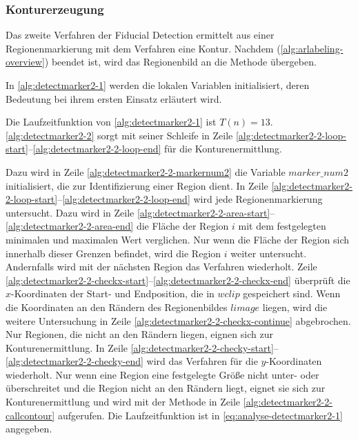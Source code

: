 \subsubsection{Konturerzeugung} %
\label{sec:konturerzeugung}

Das zweite Verfahren der Fiducial Detection ermittelt aus einer Regionenmarkierung mit dem Verfahren
  eine Kontur. Nachdem  (\autoref{alg:arlabeling-overview}) beendet ist,
 wird das Regionenbild an die Methode  übergeben.

In \autoref{alg:detectmarker2-1} werden die lokalen Variablen initialisiert, deren Bedeutung bei ihrem ersten Einsatz
 erläutert wird.

Die Laufzeitfunktion von \autoref{alg:detectmarker2-1} ist $T(n) = 13$. \autoref{alg:detectmarker2-2} sorgt mit seiner
 Schleife in Zeile \ref{alg:detectmarker2-2-loop-start}--\ref{alg:detectmarker2-2-loop-end} für die Konturenermittlung.

Dazu wird in Zeile \ref{alg:detectmarker2-2-markernum2} die Variable $\mathit{marker\_num2}$ initialisiert, die zur
 Identifizierung einer Region dient. In Zeile \ref{alg:detectmarker2-2-loop-start}--\ref{alg:detectmarker2-2-loop-end}
 wird jede Regionenmarkierung untersucht. Dazu wird in Zeile
 \ref{alg:detectmarker2-2-area-start}--\ref{alg:detectmarker2-2-area-end} die Fläche der Region $i$ mit dem festgelegten
 minimalen und maximalen Wert verglichen. Nur wenn die Fläche der Region sich innerhalb dieser Grenzen befindet, wird
 die Region $i$ weiter untersucht. Andernfalls wird mit der nächsten Region das Verfahren wiederholt. Zeile
 \ref{alg:detectmarker2-2-checkx-start}--\ref{alg:detectmarker2-2-checkx-end} überprüft die $x$-Koordinaten der
 Start- und Endposition, die in $\mathit{wclip}$ gespeichert sind. Wenn die Koordinaten an den Rändern des
 Regionenbildes $\mathit{limage}$ liegen, wird die weitere Untersuchung in Zeile
 \ref{alg:detectmarker2-2-checkx-continue} abgebrochen. Nur Regionen, die nicht an den Rändern liegen, eignen sich zur
 Konturenermittlung. In Zeile \ref{alg:detectmarker2-2-checky-start}--\ref{alg:detectmarker2-2-checky-end} wird das
 Verfahren für die $y$-Koordinaten wiederholt. Nur wenn eine Region eine festgelegte Größe nicht unter- oder
 überschreitet und die Region nicht an den Rändern liegt,
 eignet sie sich zur Konturenermittlung und wird mit der Methode  in Zeile
 \ref{alg:detectmarker2-2-callcontour} aufgerufen. Die Laufzeitfunktion ist in \autoref{eq:analyse-detectmarker2-1}
 angegeben.


